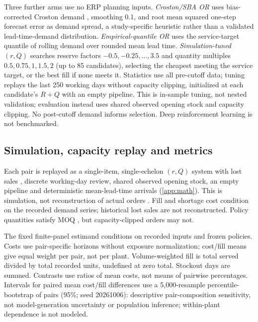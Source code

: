 \documentclass[preprint,12pt,nonatbib]{elsarticle}
\let\cite\parencite
\begin{document}
Three further arms use no ERP planning inputs. \emph{Croston/SBA OR} uses bias-corrected Croston demand \cite{croston1972forecasting, syntetos2005accuracy}, smoothing 0.1, and root mean squared one-step forecast error as demand spread, a study-specific heuristic rather than a validated lead-time-demand distribution. \emph{Empirical-quantile OR} uses the service-target quantile of rolling demand over rounded mean lead time. \emph{Simulation-tuned $(r,Q)$} searches reserve factors $-0.5,-0.25,\ldots,3.5$ and quantity multiples $0.5,0.75,1,1.5,2$ (up to 85 candidates), selecting the cheapest meeting the service target, or the best fill if none meets it. Statistics use all pre-cutoff data; tuning replays the last 250 working days without capacity clipping, initialized at each candidate's $R+Q$ with an empty pipeline. This is in-sample tuning, not nested validation; evaluation instead uses shared observed opening stock and capacity clipping. No post-cutoff demand informs selection. Deep reinforcement learning \cite{stranieri2024drl, kolyaei2025rl} is not benchmarked.

\subsection{Simulation, capacity replay and metrics}
Each pair is replayed as a single-item, single-echelon $(r,Q)$ system \cite{hadley1963analysis, axsater2015inventory, zipkin2000foundations, silver2017inventory, porteus2002foundations} with lost sales \cite{bijvank2011lost}, discrete working-day review, shared observed opening stock, an empty pipeline and deterministic mean-lead-time arrivals (\ref{app:math}). This is simulation, not reconstruction of actual orders \cite{grasso1984simulation}. Fill and shortage cost condition on the recorded demand series; historical lost sales are not reconstructed. Policy quantities satisfy MOQ \cite{heese2025moq}, but capacity-clipped orders \cite{zhang2023replenishment} may not.

The fixed finite-panel estimand conditions on recorded inputs and frozen policies. Costs use pair-specific horizons without exposure normalization; cost/fill means give equal weight per pair, not per plant. Volume-weighted fill is total served divided by total recorded units, undefined at zero total. Stockout days are summed. Contrasts use ratios of mean costs, not means of pairwise percentages. Intervals for paired mean cost/fill differences use a 5{,}000-resample percentile-bootstrap of pairs (95\%; seed 20261006): descriptive pair-composition sensitivity, not model-generation uncertainty or population inference; within-plant dependence is not modeled.
\end{document}

